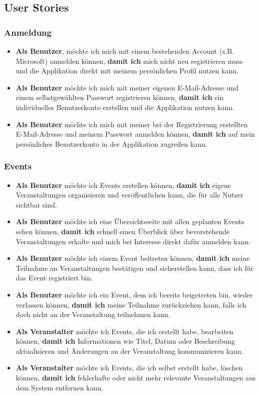 \documentclass[a4paper,12pt]{article}
\begin{document}
\subsection{User Stories}
\subsubsection{Anmeldung}
\begin{itemize}
  \item \textbf{Als Benutzer}, möchte ich mich mit einem bestehenden Account (z.B. Microsoft) anmelden können, \textbf{damit ich} mich nicht neu registrieren muss und die Applikation direkt mit meinem persönlichen Profil nutzen kann.
  \item \textbf{Als Benutzer} möchte ich mich mit meiner eigenen E-Mail-Adresse und einem selbstgewählten Passwort registrieren können, \textbf{damit ich} ein individuelles Benutzerkonto erstellen und die Applikation nutzen kann.
  \item \textbf{Als Benutzer} möchte ich mich mit meiner bei der Registrierung erstellten E-Mail-Adresse und meinem Passwort anmelden können, \textbf{damit ich} auf mein persönliches Benutzerkonto in der Applikation zugreifen kann.
\end{itemize}
\subsubsection{Events}
\begin{itemize}
  \item \textbf{Als Benutzer} möchte ich Events erstellen können, \textbf{damit ich} eigene Veranstaltungen organisieren und veröffentlichen kann, die für alle Nutzer sichtbar sind.
  \item \textbf{Als Benutzer} möchte ich eine Übersichtsseite mit allen geplanten Events sehen können, \textbf{damit ich} schnell einen Überblick über bevorstehende Veranstaltungen erhalte und mich bei Interesse direkt dafür anmelden kann.
  \item \textbf{Als Benutzer} möchte ich einem Event beitreten können, \textbf{damit ich} meine Teilnahme an Veranstaltungen bestätigen und sicherstellen kann, dass ich für das Event registriert bin.
  \item \textbf{Als Benutzer} möchte ich ein Event, dem ich bereits beigetreten bin, wieder verlassen können, \textbf{damit ich} meine Teilnahme zurückziehen kann, falls ich doch nicht an der Veranstaltung teilnehmen kann.
  \item \textbf{Als Veranstalter} möchte ich Events, die ich erstellt habe, bearbeiten können, \textbf{damit ich} Informationen wie Titel, Datum oder Beschreibung aktualisieren und Änderungen an der Veranstaltung kommunizieren kann.
  \item \textbf{Als Veranstalter} möchte ich Events, die ich selbst erstellt habe, löschen können, \textbf{damit ich} fehlerhafte oder nicht mehr relevante Veranstaltungen aus dem System entfernen kann.
\end{itemize}
\end{document}
